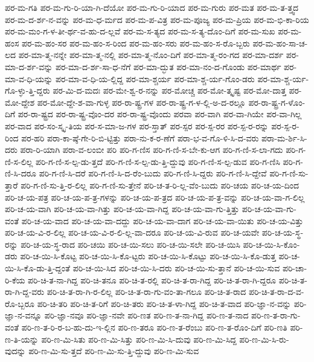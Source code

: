 {ಪರ-ಮ-ಗತಿ
ಪರ-ಮ-ಗು-ರಿ-ಯಾ-ಗಿ-ದೆಯೋ
ಪರ-ಮ-ಗು-ರಿ-ಯಾದ
ಪರ-ಮ-ಗುರು
ಪರ-ಮತ
ಪರ-ಮ-ತ-ತ್ತ್ವದ
ಪರ-ಮ-ದ-ರ್ಶ-ನ-ವನ್ನು
ಪರ-ಮ-ಧ-ರ್ಮದ
ಪರ-ಮ-ಪ-ವಿತ್ರ
ಪರ-ಮ-ಪೂಜ್ಯ
ಪರ-ಮ-ಪ್ರಿಯ
ಪರ-ಮ-ಭಿ-ಕಾ-ರಿಯ
ಪರ-ಮ-ಮಂ-ಗ-ಳ-ತೀ-ರ್ಥ-ವ-ಹು-ದ-ಲ್ಲವೆ
ಪರ-ಮ-ಸ-ತ್ಯದ
ಪರ-ಮ-ಸ-ತ್ಯ-ದೊಂ-ದಿಗೆ
ಪರ-ಮ-ಸುಖ
ಪರ-ಮ-ಹಂಸ
ಪರ-ಮ-ಹಂ-ಸರ
ಪರ-ಮ-ಹಂ-ಸ-ರಿಂದ
ಪರ-ಮ-ಹಂ-ಸರು
ಪರ-ಮ-ಹಂ-ಸ-ರೊ-ಬ್ಬರು
ಪರ-ಮ-ಹಂ-ಸಾ-ಚ-ಲದ
ಪರ-ಮಾ-ತ್ಮ-ನನ್ನೇ
ಪರ-ಮಾ-ತ್ಮ-ನಲ್ಲಿ
ಪರ-ಮಾ-ತ್ಮ-ನೊಂ-ದಿಗೆ
ಪರ-ಮಾ-ತ್ಮ-ರಂ-ಗದ
ಪರ-ಮಾ-ದರ್ಶ
ಪರ-ಮಾ-ದ-ರ್ಶ-ವನ್ನು
ಪರ-ಮಾ-ದ-ರ್ಶ-ಸಾ-ಧ-ನೆಗೆ
ಪರ-ಮಾ-ದ್ಭುತ
ಪರ-ಮಾ-ನಂ-ದ-ಗೊಂಡು
ಪರ-ಮಾರ್ಥ
ಪರ-ಮಾ-ವ-ಧಿ-ಯನ್ನು
ಪರ-ಮಾ-ವ-ಧಿ-ಯ-ಲ್ಲಿದ್ದ
ಪರ-ಮಾ-ಶ್ಚರ್ಯ
ಪರ-ಮಾ-ಶ್ಚ-ರ್ಯ-ಗೊಂ-ಡರು
ಪರ-ಮಾ-ಶ್ಚ-ರ್ಯ-ಗೊ-ಳ್ಳು-ತ್ತಿ-ದ್ದರು
ಪರ-ಮಿ-ದ-ಮದಃ
ಪರ-ಮೇ-ಶ್ವ-ರ-ನನ್ನು
ಪರ-ಮೋಚ್ಚ
ಪರ-ಮೋ-ತ್ಕೃಷ್ಟ
ಪರ-ಮೋ-ದಾತ್ತ
ಪರ-ಮೋ-ದ್ದೇಶ
ಪರ-ಮೋ-ದ್ದೇ-ಶ-ವಾ-ಗುಳ್ಳ
ಪರ-ರಾ-ಷ್ಟ್ರ-ಗಳ
ಪರ-ರಾ-ಷ್ಟ್ರ-ಗ-ಳ-ಲ್ಲಿ-ಅ-ದ-ರಲ್ಲೂ
ಪರ-ರಾ-ಷ್ಟ್ರ-ಗ-ಳೊಂ-ದಿಗೆ
ಪರ-ರಾ-ಷ್ಟ್ರದ
ಪರ-ರಾ-ಷ್ಟ್ರ-ವೊಂ-ದರ
ಪರ-ರಾ-ಷ್ಟ್ರ-ವೊಂದು
ಪರವಾ
ಪರ-ವಾಗಿ
ಪರ-ವಾ-ಗಿಯೇ
ಪರ-ವಾ-ಗಿಲ್ಲ
ಪರ-ವಾದ
ಪರ-ಸಂ-ಸ್ಕೃ-ತಿಯ
ಪರ-ಸ-ಮಾ-ಜ-ಗಳ
ಪರ-ಸ್ತಾತ್
ಪರ-ಸ್ಪರ
ಪರ-ಸ್ಪ-ರರ
ಪರ-ಸ್ಪ-ರ-ರನ್ನು
ಪರ-ಸ್ಪ-ರ-ರಿಂದ
ಪರ-ಹರಿ
ಪರಾ-ಕಾ-ಷ್ಠೆ-ಗೇ-ರಿ-ಬಿ-ಟ್ಟಿತ್ತು
ಪರಾ-ನು-ಕ-ರ-ಣೆಗೆ
ಪರಾ-ಭ-ವ-ಗೊ-ಳಿ-ಸಿ-ದ-ವರು
ಪರಾ-ಮ-ರ್ಶಿ-ಸಿ-ದರು
ಪರಾ-ರಿ-ಯಾಗಿ
ಪರಾ-ವ-ಲಂಬೀ
ಪರಿ
ಪರಿ-ಗ-ಣಿಸ
ಪರಿ-ಗ-ಣಿ-ಸ-ಬೇ-ಕು-ಆಗ
ಪರಿ-ಗ-ಣಿ-ಸ-ಲಾ-ಗದು
ಪರಿ-ಗ-ಣಿ-ಸ-ಲಿಲ್ಲ
ಪರಿ-ಗ-ಣಿ-ಸ-ಲ್ಪ-ಡು-ತ್ತದೆ
ಪರಿ-ಗ-ಣಿ-ಸ-ಲ್ಪ-ಡು-ತ್ತಿ-ದ್ದುವು
ಪರಿ-ಗ-ಣಿ-ಸ-ಲ್ಪ-ಡುವ
ಪರಿ-ಗ-ಣಿಸಿ
ಪರಿ-ಗ-ಣಿ-ಸಿ-ದರೂ
ಪರಿ-ಗ-ಣಿ-ಸಿ-ದರೆ
ಪರಿ-ಗ-ಣಿ-ಸಿ-ದ-ರೆಂ-ಬುದು
ಪರಿ-ಗ-ಣಿ-ಸಿ-ದ್ದರು
ಪರಿ-ಗ-ಣಿ-ಸಿ-ದ್ದೇವೆ
ಪರಿ-ಗ-ಣಿ-ಸು-ತ್ತಾರೆ
ಪರಿ-ಗ-ಣಿ-ಸು-ತ್ತಿ-ರ-ಲಿಲ್ಲ
ಪರಿ-ಗ-ಣಿ-ಸು-ತ್ತೇನೆ
ಪರಿ-ಚ-ತ-ರಿ-ಲ್ಲ-ವೆಂ-ಬುದು
ಪರಿ-ಚಯ
ಪರಿ-ಚ-ಯ-ದಿಂದ
ಪರಿ-ಚ-ಯ-ಪತ್ರ
ಪರಿ-ಚ-ಯ-ಪ-ತ್ರ-ಗಳನ್ನು
ಪರಿ-ಚ-ಯ-ಪ-ತ್ರದ
ಪರಿ-ಚ-ಯ-ಪ-ತ್ರ-ವನ್ನು
ಪರಿ-ಚ-ಯ-ವಾ-ಗ-ಲಿಲ್ಲ
ಪರಿ-ಚ-ಯ-ವಾಗಿ
ಪರಿ-ಚ-ಯ-ವಾ-ಗಿತ್ತು
ಪರಿ-ಚ-ಯ-ವಾ-ಗಿದ್ದ
ಪರಿ-ಚ-ಯ-ವಾ-ಗು-ತ್ತಿತ್ತು
ಪರಿ-ಚ-ಯ-ವಾ-ಗು-ವಂತೆ
ಪರಿ-ಚ-ಯ-ವಾದ
ಪರಿ-ಚ-ಯ-ವಾ-ದದ್ದು
ಪರಿ-ಚ-ಯ-ವಾ-ದಾಗ
ಪರಿ-ಚ-ಯ-ವಾ-ಯಿತು
ಪರಿ-ಚ-ಯ-ವಿತ್ತು
ಪರಿ-ಚ-ಯ-ವಿ-ರ-ಲಿಲ್ಲ
ಪರಿ-ಚ-ಯ-ವಿ-ರ-ಲಿ-ಲ್ಲ-ವಾ-ದರೂ
ಪರಿ-ಚ-ಯ-ವಿ-ರುವ
ಪರಿ-ಚ-ಯವೇ
ಪರಿ-ಚ-ಯ-ಸ್ಥ-ರನ್ನು
ಪರಿ-ಚ-ಯ-ಸ್ಥ-ರಾದ
ಪರಿ-ಚಯಿ
ಪರಿ-ಚ-ಯಿ-ಸಲು
ಪರಿ-ಚ-ಯಿ-ಸಲೇ
ಪರಿ-ಚ-ಯಿಸಿ
ಪರಿ-ಚ-ಯಿ-ಸಿ-ಕೊಂ-ಡರು
ಪರಿ-ಚ-ಯಿ-ಸಿ-ಕೊಟ್ಟ
ಪರಿ-ಚ-ಯಿ-ಸಿ-ಕೊ-ಟ್ಟರು
ಪರಿ-ಚ-ಯಿ-ಸಿ-ಕೊಟ್ಟು
ಪರಿ-ಚ-ಯಿ-ಸಿ-ಕೊ-ಡುತ್ತ
ಪರಿ-ಚ-ಯಿ-ಸಿ-ಕೊ-ಡು-ತ್ತಿ-ದ್ದಂತೆ
ಪರಿ-ಚ-ಯಿ-ಸಿದ
ಪರಿ-ಚ-ಯಿ-ಸಿ-ದರು
ಪರಿ-ಚ-ಯಿ-ಸು-ತ್ತಾನೆ
ಪರಿ-ಚ-ಯಿ-ಸುವ
ಪರಿ-ಚಾ-ರಿ-ಕೆಯ
ಪರಿ-ಚಿ-ತ-ನಾ-ಗಿದ್ದ
ಪರಿ-ಚಿ-ತನೂ
ಪರಿ-ಚಿ-ತ-ರಲ್ಲಿ
ಪರಿ-ಚಿ-ತ-ರಾ-ಗಿದ್ದ
ಪರಿ-ಚಿ-ತ-ರಾ-ಗಿ-ದ್ದರೂ
ಪರಿ-ಚಿ-ತ-ರಾ-ಗಿ-ದ್ದ-ವರು
ಪರಿ-ಚಿ-ತ-ರಾ-ಗಿ-ರ-ಲಿಲ್ಲ
ಪರಿ-ಚಿ-ತ-ರಾ-ಗು-ವಂ-ತಾ-ಗಲೂ
ಪರಿ-ಚಿ-ತ-ರಾದ
ಪರಿ-ಚಿ-ತ-ರಾ-ದ-ವ-ರೊ-ಬ್ಬರೂ
ಪರಿ-ಚಿ-ತರಿ
ಪರಿ-ಚಿ-ತ-ರಿಗೆ
ಪರಿ-ಚಿ-ತರು
ಪರಿ-ಚಿ-ತ-ಳಾ-ಗಿದ್ದ
ಪರಿ-ಚಿ-ತ-ವಾದ
ಪರಿ-ಜ್ಞಾ-ನ-ವನ್ನು
ಪರಿ-ಜ್ಞಾ-ನ-ವನ್ನೂ
ಪರಿ-ಜ್ಞಾ-ನವೂ
ಪರಿ-ಜ್ಞಾ-ನವೇ
ಪರಿ-ಣತ
ಪರಿ-ಣ-ತ-ನಾ-ಗಿದ್ದ
ಪರಿ-ಣ-ತ-ನಾದ
ಪರಿ-ಣ-ತ-ರಾ-ಗು-ವಂತೆ
ಪರಿ-ಣ-ತ-ರಿ-ರ-ಬ-ಹು-ದು-ಇ-ಲ್ಲಿನ
ಪರಿ-ಣ-ತರೂ
ಪರಿ-ಣ-ತ-ರೆಂಬು
ಪರಿ-ಣ-ತ-ರೊಂ-ದಿಗೆ
ಪರಿ-ಣತಿ
ಪರಿ-ಣ-ತಿ-ಯನ್ನು
ಪರಿ-ಣ-ಮಿ-ಸಿತು
ಪರಿ-ಣ-ಮಿ-ಸಿತ್ತು
ಪರಿ-ಣ-ಮಿ-ಸಿ-ದುವು
ಪರಿ-ಣ-ಮಿ-ಸಿದ್ದ
ಪರಿ-ಣ-ಮಿ-ಸಿ-ರು-ವುದನ್ನು
ಪರಿ-ಣ-ಮಿ-ಸು-ತ್ತದೆ
ಪರಿ-ಣ-ಮಿ-ಸು-ತ್ತಿ-ದ್ದುವು
ಪರಿ-ಣ-ಮಿ-ಸುವ
}
